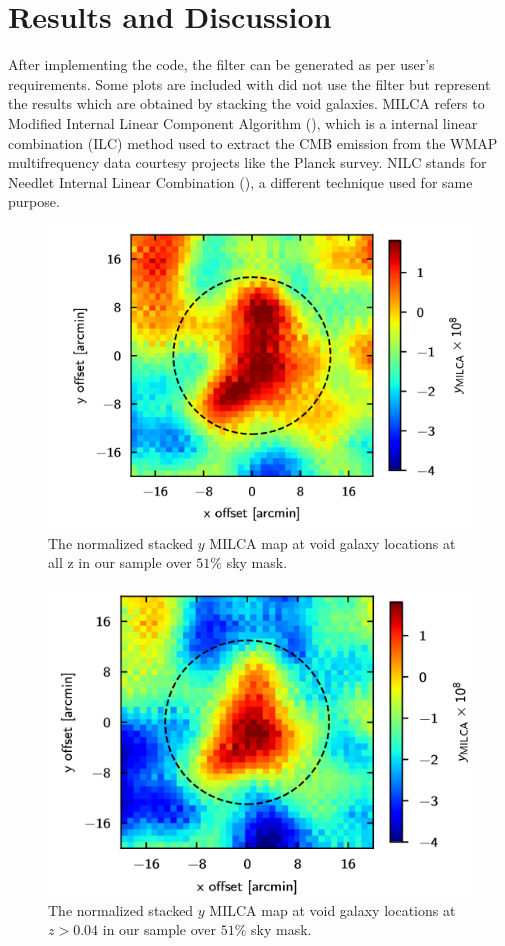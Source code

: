 \chapter{\label{results}Results and Discussion}
After implementing the code, the filter can be generated as per user's requirements. Some plots are included with did not use the filter but represent the results which are obtained by stacking the void galaxies. MILCA refers to Modified Internal Linear Component Algorithm (\cite{hurier_milca_2013}), which is a internal linear combination (ILC) method used to extract the CMB emission from the WMAP multifrequency data courtesy projects like the Planck survey. NILC stands for Needlet Internal Linear Combination (\cite{remazeilles_cmb_2011}), a different technique used for same purpose.
\begin{figure}[h!]
	\centering
	\includegraphics{fig2.png}
	\caption{The normalized stacked $ y $ MILCA map at void galaxy locations at all z in our sample over $ 51\% $ sky mask.}
\end{figure}
\begin{figure}[h!]
	\centering
	\includegraphics{fig3-1.png}
	\caption{The normalized stacked $ y $ MILCA map at void galaxy locations at $ z > 0.04 $ in our sample over $ 51\% $ sky mask.}
\end{figure}
